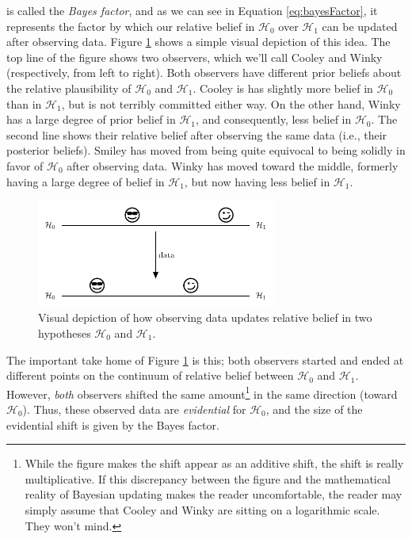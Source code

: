 \documentclass[english,,doc,floatsintext]{apa6}
\let\rmarkdownfootnote\footnote%
\def\footnote{\protect\rmarkdownfootnote}
\begin{document}
is called the \emph{Bayes factor}, and as we can see in Equation \eqref{eq:bayesFactor}, it represents the factor by which our relative belief in \(\mathcal{H}_0\) over \(\mathcal{H}_1\) can be updated after observing data. Figure \ref{fig:bayesUpdating} shows a simple visual depiction of this idea. The top line of the figure shows two observers, which we'll call Cooley and Winky (respectively, from left to right). Both observers have different prior beliefs about the relative plausibility of \(\mathcal{H}_0\) and \(\mathcal{H}_1\). Cooley is has slightly more belief in \(\mathcal{H}_0\) than in \(\mathcal{H}_1\), but is not terribly committed either way. On the other hand, Winky has a large degree of prior belief in \(\mathcal{H}_1\), and consequently, less belief in \(\mathcal{H}_0\). The second line shows their relative belief after observing the same data (i.e., their posterior beliefs). Smiley has moved from being quite equivocal to being solidly in favor of \(\mathcal{H}_0\) after observing data. Winky has moved toward the middle, formerly having a large degree of belief in \(\mathcal{H}_1\), but now having less belief in \(\mathcal{H}_1\).

\begin{figure}
\centering
\includegraphics[width=0.7\textwidth,height=\textheight]{figures/bayesUpdating.pdf}
\caption{\label{fig:bayesUpdating}Visual depiction of how observing data updates relative belief in two hypotheses \(\mathcal{H}_0\) and \(\mathcal{H}_1\).}
\end{figure}

The important take home of Figure \ref{fig:bayesUpdating} is this; both observers started and ended at different points on the continuum of relative belief between \(\mathcal{H}_0\) and \(\mathcal{H}_1\). However, \emph{both} observers shifted the same amount\footnote{While the figure makes the shift appear as an additive shift, the shift is really multiplicative. If this discrepancy between the figure and the mathematical reality of Bayesian updating makes the reader uncomfortable, the reader may simply assume that Cooley and Winky are sitting on a logarithmic scale. They won't mind.} in the same direction (toward \(\mathcal{H}_0\)). Thus, these observed data are \emph{evidential} for \(\mathcal{H}_0\), and the size of the evidential shift is given by the Bayes factor.
\end{document}
